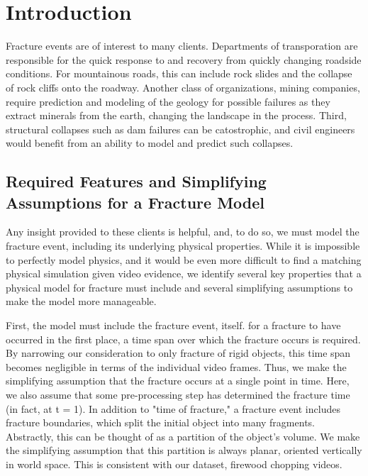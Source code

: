 \documentclass[runningheads]{llncs}
\begin{document}
\section{Introduction}

Fracture events are of interest to many clients. Departments of 
transporation are responsible for the quick response to and recovery from 
quickly changing roadside conditions. For mountainous roads, this can include 
rock slides and 
the collapse of rock cliffs onto the roadway. Another class of organizations, 
mining companies, require prediction and modeling of the geology for possible 
failures as they extract 
minerals from the earth, changing the landscape in the process. Third, 
structural collapses such as dam failures 
can be catostrophic, and civil engineers would benefit from 
an ability to model and predict such collapses.

\subsection{Required Features and Simplifying Assumptions for a Fracture Model}
\label{req-features-and-simplifying-assumptions}

Any insight provided to these clients is helpful, and, to do so, we must model 
the fracture event, including its underlying physical properties. While 
it is impossible to perfectly model physics, 
and it would be even more difficult to find a matching physical simulation given 
video evidence, we identify several key properties that a physical model for 
fracture must include and several simplifying assumptions to make the model 
more manageable.

First, the model must include the fracture event, itself. 
for a fracture to have occurred in the first 
place, a time span over which the fracture occurs is required. By narrowing our 
consideration to only fracture of rigid objects, this time 
span becomes negligible in terms of the individual video frames. Thus, we make the 
simplifying assumption that the fracture occurs at a single point in time. Here, 
we also assume that some pre-processing step has determined the fracture time (in fact, at t = 1). In 
addition to "time of fracture," a fracture event includes fracture boundaries, 
which split the initial object into many fragments. Abstractly, this can be 
thought of as a partition of the object's volume. We make the simplifying 
assumption that this partition is always planar, oriented vertically in world 
space. This is consistent with our dataset, firewood chopping videos.
\end{document}
